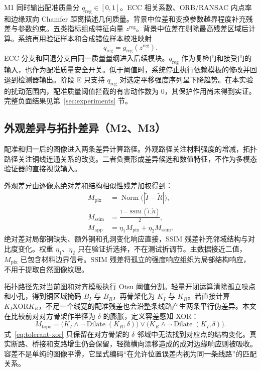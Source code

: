 M1 同时输出配准质量分 $q_{\mathrm{reg}}\in[0,1]$。ECC 相关系数、ORB/RANSAC 内点率和边缘双向 Chamfer 距离描述几何质量。背景中位差和变换参数越界程度补充残差与参数约束。五类指标组成特征向量 $z^{\mathrm{reg}}$。背景中位差在剔除最高残差区域后计算。系统再用验证样本和合成错位样本校准映射
\begin{equation}
  q_{\mathrm{reg}}=g_{\mathrm{reg}}(z^{\mathrm{reg}}).
  \label{eq:qreg}
\end{equation}
ECC 分支和回退分支由同一质量量纲进入后续模块。$q_{\mathrm{reg}}$ 作为复检门和接受门的输入，也作为配准质量安全开关。低于阈值时，系统停止执行依赖模板的修改并回退到检测器输出。阶段 E 只支持 $q_{\mathrm{reg}}$ 对选定平移强度序列呈下降趋势。在本实验的扰动范围内，配准质量阈值拦截的有害动作数为 0，其保护作用尚未得到实证。完整负面结果见第~\ref{sec:experiments} 节。

\subsection{外观差异与拓扑差异（M2、M3）}
\label{subsec:appearance-topology}

配准和归一后的图像进入两条差异计算路径。外观路径关注材料强度的增减，拓扑路径关注铜线连通关系的改变。二者负责形成差异候选和数值特征，不作为多模态验证器的直接视觉输入。

外观差异由逐像素绝对差和结构相似性残差加权得到：
\begin{align}
  M_{\mathrm{pix}} &= \operatorname{Norm}\bigl(|\widetilde I-\widetilde R|\bigr), \\
  M_{\mathrm{ssim}} &= \frac{1-\operatorname{SSIM}(\widetilde I,\widetilde R)}{2}, \\
  M_{\mathrm{app}} &= \eta_1 M_{\mathrm{pix}}+\eta_2 M_{\mathrm{ssim}}.
  \label{eq:appearance-map}
\end{align}
绝对差对局部铜缺失、额外铜和孔洞变化响应直接，SSIM 残差补充邻域结构与对比度变化。权重 $\eta_1$、$\eta_2$ 只在验证折选择，不在测试折调节。主数据接近二值，$M_{\mathrm{pix}}$ 已包含材料边界信号。SSIM 残差将孤立的强度响应组织为局部结构响应，不用于提取自然图像纹理。

拓扑路径先对当前图和对齐模板执行 Otsu 阈值分割。轻量开闭运算清除孤立噪点和小孔，得到铜区域掩码 $B_I$ 与 $B_R$，再骨架化为 $K_I$ 与 $K_R$。若直接计算 $K_I\mathbin{\mathrm{XOR}}K_R$，不足一个线宽的配准残差也会沿整条线路产生两条平行伪差异。本文在比较前对对方骨架作半径为 $\delta$ 的膨胀，定义容差感知 XOR：
\begin{equation}
  M_{\mathrm{topo}}=
  \bigl(K_I\land\neg\operatorname{Dilate}(K_R,\delta)\bigr)
  \lor
  \bigl(K_R\land\neg\operatorname{Dilate}(K_I,\delta)\bigr).
  \label{eq:tolerant-xor}
\end{equation}
式~\eqref{eq:tolerant-xor} 只保留在对方骨架的 $\delta$ 邻域中无法找到对应点的结构变化。真实断路、桥接和支路增生仍会保留，轻微横向漂移造成的成对边缘响应则被吸收。容差不是单纯的图像平滑，它显式编码“在允许位置误差内视为同一条线路”的匹配关系。

